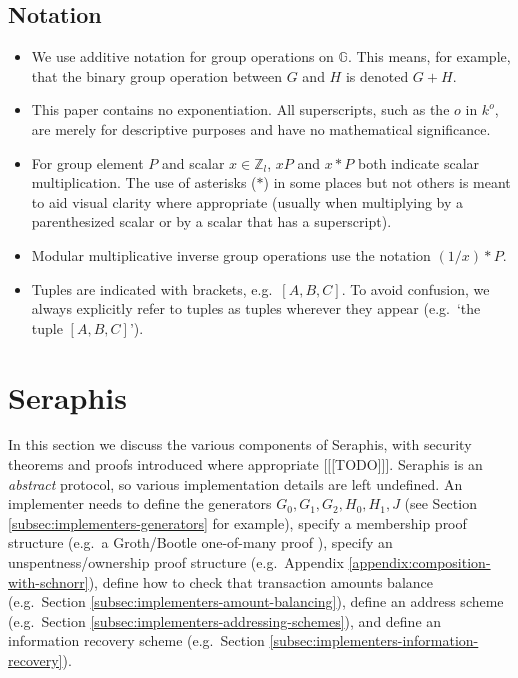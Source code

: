 \subsection{Notation}
\label{subsec:preliminaries-notation}

\begin{itemize}
    \item We use additive notation for group operations on $\mathbb{G}$. This means, for example, that the binary group operation between $G$ and $H$ is denoted $G + H$.

    \item This paper contains no exponentiation. All superscripts, such as the $o$ in $k^o$, are merely for descriptive purposes and have no mathematical significance.

    \item For group element $P$ and scalar $x \in \mathbb{Z}_l$, $x P$ and $x*P$ both indicate scalar multiplication. The use of asterisks ($*$) in some places but not others is meant to aid visual clarity where appropriate (usually when multiplying by a parenthesized scalar or by a scalar that has a superscript).

    \item Modular multiplicative inverse group operations use the notation $(1/x)*P$.

    \item Tuples are indicated with brackets, e.g.\ $[A, B, C]$. To avoid confusion, we always explicitly refer to tuples as tuples wherever they appear (e.g.\ `the tuple $[A, B, C]$').
\end{itemize}



\section{Seraphis}
\label{sec:seraphis}

In this section we discuss the various components of Seraphis, with security theorems and proofs introduced where appropriate [[[TODO]]]. Seraphis is an {\em abstract} protocol, so various implementation details are left undefined. An implementer needs to define the generators $G_0, G_1, G_2, H_0, H_1, J$ (see Section \ref{subsec:implementers-generators} for example), specify a membership proof structure (e.g.\ a Groth/Bootle one-of-many proof \cite{groth-one-out-of-many, bootle-one-of-many, triptych-preprint, lelantus-spark}), specify an unspentness/ownership proof structure (e.g.\ Appendix \ref{appendix:composition-with-schnorr}), define how to check that transaction amounts balance (e.g.\ Section \ref{subsec:implementers-amount-balancing}), define an address scheme (e.g.\ Section \ref{subsec:implementers-addressing-schemes}), and define an information recovery scheme (e.g.\ Section \ref{subsec:implementers-information-recovery}).


